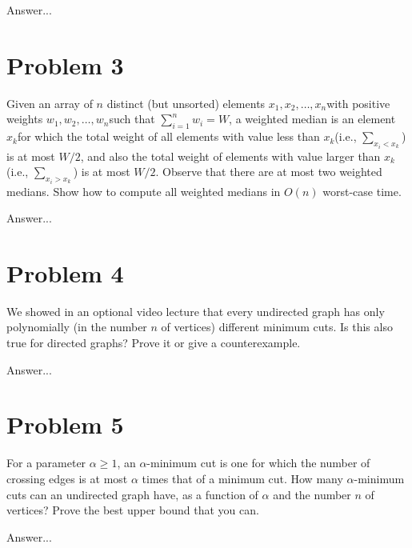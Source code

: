 \documentclass[10pt]{article}
\begin{document}
Answer...

\section*{\normalsize Problem 3}

Given an array of $n$ distinct (but unsorted) elements $x_1, x_2, \dots, x_n$​ with positive weights $w_1, w_2, \dots, w_n$​ such that $\sum_{i=1}^{n} w_i = W$, a weighted median is an element $x_k$​ for which the total weight of all elements with value less than $x_k$​ (i.e., $\sum_{x_i < x_k}$) is at most $W/2$, and also the total weight of elements with value larger than $x_k$​ (i.e., $\sum_{x_i > x_k}$) is at most $W/2$. Observe that there are at most two weighted medians. Show how to compute all weighted medians in $O(n)$ worst-case time.
\bigskip

Answer...

\section*{\normalsize Problem 4}

We showed in an optional video lecture that every undirected graph has only polynomially (in the number $n$ of vertices) different minimum cuts. Is this also true for directed graphs? Prove it or give a counterexample.
\bigskip

Answer...

\section*{\normalsize Problem 5}

For a parameter $\alpha \geq 1$, an $\alpha$-minimum cut is one for which the number of crossing edges is at most $\alpha$ times that of a minimum cut. How many $\alpha$-minimum cuts can an undirected graph have, as a function of $\alpha$ and the number $n$ of vertices? Prove the best upper bound that you can.
\bigskip

Answer...
\end{document}
